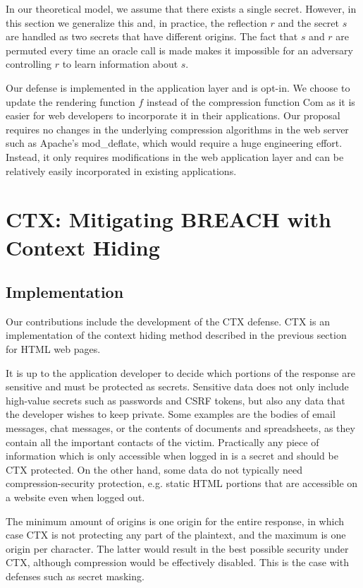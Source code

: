 In our theoretical model, we assume that there exists a single secret. However,
in this section we generalize this and, in practice, the reflection $r$ and the
secret $s$ are handled as two secrets that have different origins. The fact
that $s$ and $r$ are permuted every time an oracle call is made makes it
impossible for an adversary controlling $r$ to learn information about $s$.

Our defense is implemented in the application layer and is opt-in. We choose to
update the rendering function $f$ instead of the compression function
$\textrm{Com}$ as it is easier for web developers to incorporate it in their
applications. Our proposal requires no changes in the underlying compression
algorithms in the web server such as Apache's mod\_deflate, which would require
a huge engineering effort. Instead, it only requires modifications in the web
application layer and can be relatively easily incorporated in existing
applications.

\section{CTX: Mitigating BREACH with Context Hiding }\label{sec:ctx}

\subsection{Implementation}
Our contributions include the development of the CTX defense. CTX is an
implementation of the context hiding method described in the previous section
for HTML web pages.

It is up to the application developer to decide which portions of the response
are sensitive and must be protected as secrets. Sensitive data does not only
include high-value secrets such as passwords and CSRF tokens, but also any data
that the developer wishes to keep private. Some examples are the bodies of email
messages, chat messages, or the contents of documents and spreadsheets, as they
contain all the important contacts of the victim. Practically any piece of
information which is only accessible when logged in is a secret and should be
CTX protected. On the other hand, some data do not typically need
compression-security protection, e.g. static HTML portions that are accessible
on a website even when logged out.

The minimum amount of origins is one origin for the entire response, in which
case CTX is not protecting any part of the plaintext, and the maximum is one
origin per character. The latter would result in the best possible security
under CTX, although compression would be effectively disabled. This is the case
with defenses such as secret masking.


